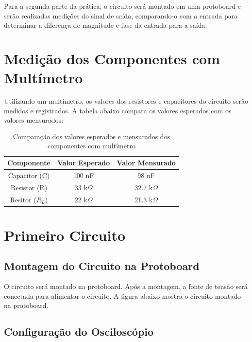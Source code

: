 \documentclass[
	12pt,				%
	openright,			%
	twoside,			%
	a4paper,			%
	english,			%
	french,				%
	spanish,			%
	brazil,				%
	]{abntex2}
\begin{document}
Para a segunda parte da prática, o circuito será montado em uma protoboard e serão realizadas medições do sinal de saída, comparando-o com a entrada para determinar a diferença de magnitude e fase da entrada para a saída.

\section{Medição dos Componentes com Multímetro}

Utilizando um multímetro, os valores dos resistores e capacitores do circuito serão medidos e registrados. A tabela abaixo compara os valores esperados com os valores mensurados:

\begin{table}[H]
    \small
    \scriptsize
    \centering
    \begin{tabular}{|c|c|c|}
        \hline
        Componente & Valor Esperado & Valor Mensurado \\
        \hline
        Capacitor (C) & 100 nF & 98 nF \\
        Resistor (R) & 33 k\(\Omega\) & 32.7 k\(\Omega\) \\
        Resitor ($R_L$) & 22 k\(\Omega\)  & 21.3 k\(\Omega\) \\
        \hline
    \end{tabular}
    \caption{Comparação dos valores esperados e mensurados dos componentes com multímetro \cite{keysight-u1250}}
    \label{tab:component_values}
\end{table}


\section{Primeiro Circuito}


\subsection{Montagem do Circuito na Protoboard}

O circuito será montado na protoboard. Após a montagem, a fonte de tensão será conectada para alimentar o circuito. A figura abaixo mostra o circuito montado na protoboard.



\subsection{Configuração do Osciloscópio}
\end{document}
